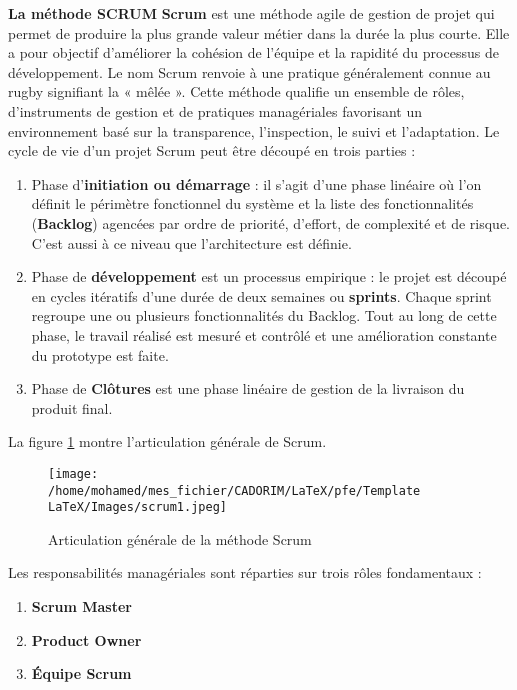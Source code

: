 \textbf{La méthode SCRUM}
\newline
\textbf{Scrum} est une méthode agile de gestion de projet qui permet de produire la plus grande valeur métier dans la durée la plus courte. Elle a pour objectif d’améliorer la cohésion de l’équipe et la rapidité du processus de développement. Le nom Scrum renvoie à une pratique généralement connue au rugby signifiant la « mêlée ». \newline
Cette méthode qualifie un ensemble de rôles, d’instruments de gestion et de pratiques managériales favorisant un environnement basé sur la transparence, l’inspection, le suivi et l’adaptation. Le cycle de vie d’un projet Scrum peut être découpé en trois parties :
\begin{enumerate}
	\item Phase d'\textbf{initiation ou démarrage} : il s’agit d’une phase linéaire où l’on définit le périmètre fonctionnel du système et la liste des fonctionnalités (\textbf{Backlog}) agencées par ordre de priorité, d’effort, de complexité et de risque. C’est aussi à ce niveau que l’architecture est définie.
	
	\item Phase de \textbf{développement} est un processus empirique : le projet est découpé en cycles itératifs d’une durée de deux semaines ou \textbf{sprints}. Chaque sprint regroupe une ou plusieurs fonctionnalités du Backlog. Tout au long de cette phase, le travail réalisé est mesuré et contrôlé et une amélioration constante du prototype est faite.
	
	\item Phase de \textbf{Clôtures} est une phase linéaire de gestion de la livraison du produit final.
\end{enumerate}
La figure \ref{Scrum} montre l’articulation générale de Scrum. \newline
\begin{figure}[h]
	\texttt{[image: /home/mohamed/mes\_fichier/CADORIM/LaTeX/pfe/Template LaTeX/Images/scrum1.jpeg]}
	\centering
	\caption{Articulation générale de la méthode Scrum}
	\label{Scrum}
\end{figure}
Les responsabilités managériales sont réparties sur trois rôles fondamentaux :
\begin{enumerate}
	\item \textbf{Scrum Master}
	\item \textbf{Product Owner}
	\item \textbf{Équipe Scrum}
	\newline
\end{enumerate}
